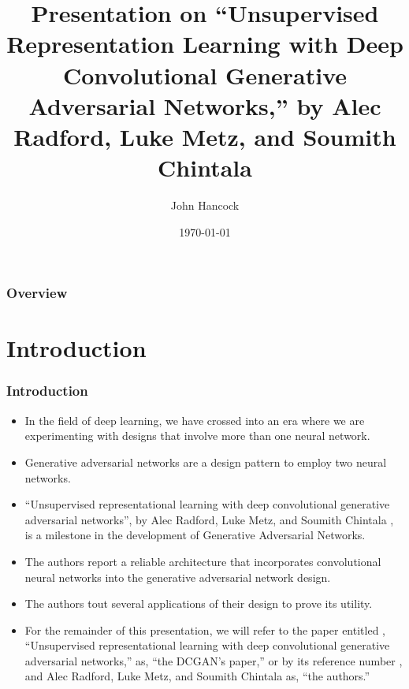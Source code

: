 \documentclass{beamer}
\title[Unsupervised Representation Learning with Deep Convolutional
Generative Adversarial Networks]{Presentation on ``Unsupervised Representation 
Learning with Deep Convolutional Generative Adversarial Networks,'' by Alec Radford, Luke Metz, and Soumith Chintala} %
\author{John Hancock} %
\institute[FAU] %
{
Florida Atlantic University \\ %
\medskip
\textit{jhancoc4@fau.edu} %
}
\date{\today} %
\begin{document}
\begin{frame}
\titlepage %
\end{frame}

\begin{frame}
\frametitle{Overview} %
\tableofcontents %
\end{frame}

\section{Introduction}
\begin{frame}
\frametitle{Introduction}
\begin{itemize}
    \item In the field of deep learning, we have crossed into an era where we
are experimenting with designs that involve more than one neural network.  
    
    \item Generative adversarial networks are a design pattern to employ two
neural networks.  
    
    \item ``Unsupervised representational learning with deep convolutional
generative adversarial networks'', by Alec Radford,  Luke Metz, and Soumith Chintala
\cite{repLearnDcgan}, is a milestone in the development of Generative Adversarial 
Networks. 
    \item The authors report a reliable architecture that incorporates convolutional 
neural networks into the generative adversarial network design.  
    
    \item The authors tout several applications of their design to prove its
utility.
    
    \item 
    \begin{tiny} For the remainder of this presentation, we will refer to the paper
entitled , ``Unsupervised representational learning with deep convolutional
generative adversarial networks,'' as,  ``the DCGAN's paper,'' or by its
reference number \cite{repLearnDcgan}, and Alec Radford,  Luke Metz, and Soumith 
Chintala as, ``the authors.''
\end{tiny}
\end{itemize}
\end{frame}
\end{document}
